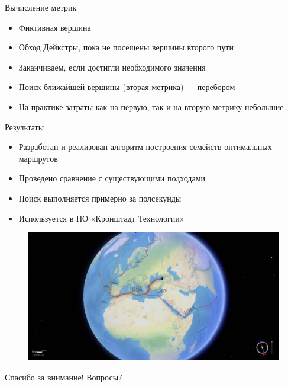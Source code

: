 \documentclass[mathserif]{beamer}
\begin{document}
\begin{frame}{Вычисление метрик}
    \begin{itemize}
        \item Фиктивная вершина
        \item Обход Дейкстры, пока не посещены вершины второго пути 
        \item Заканчиваем, если достигли необходимого значения
        \item Поиск ближайшей вершины (вторая метрика) — перебором
        \item На практике затраты как на первую, так и на вторую
          метрику небольшие
    \end{itemize}
\end{frame}

\begin{frame}{Результаты}
     {
        \begin{itemize}
            \item Разработан и реализован алгоритм построения семейств оптимальных маршрутов 
            \item Проведено сравнение с существующими подходами 
            \item Поиск выполняется примерно за полсекунды 
            \item Используется в ПО «Кронштадт Технологии»
        \end{itemize}
    }
     {
        \begin{figure}
            \includegraphics[width=\textwidth]{results}
        \end{figure}
    }
\end{frame}

\begin{frame}{Спасибо за внимание!}
    Вопросы?
\end{frame}
\end{document}
